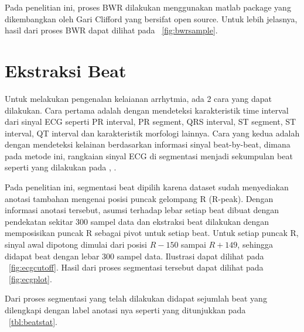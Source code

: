 Pada penelitian ini, proses BWR dilakukan menggunakan matlab package yang
dikembangkan oleh Gari Clifford \cite{clifford-2005} yang bersifat open source.
Untuk lebih jelasnya, hasil dari proses BWR dapat dilihat pada
\pic~\ref{fig:bwrsample}.


\section{Ekstraksi Beat}
\label{sec:ekstractbeat}
Untuk melakukan pengenalan kelaianan arrhytmia, ada 2 cara yang dapat dilakukan.
Cara pertama adalah dengan mendeteksi karakteristik time interval dari sinyal
ECG seperti PR interval, PR segment, QRS interval, ST segment, ST interval, QT
interval dan karakteristik morfologi lainnya. Cara yang kedua adalah dengan
mendeteksi kelainan berdasarkan informasi sinyal beat-by-beat, dimana pada
metode ini, rangkaian sinyal ECG di segmentasi menjadi sekumpulan beat seperti
yang dilakukan pada \cite{Ghongade.1}, \cite{zhao-2005}.

Pada penelitian ini, segmentasi beat dipilih karena dataset sudah menyediakan 
anotasi tambahan mengenai posisi puncak gelompang R (R-peak). Dengan informasi
anotasi tersebut, asumsi terhadap lebar setiap beat dibuat dengan pendekatan
sekitar 300 sampel data dan ekstraksi beat dilakukan dengan memposisikan puncak
R sebagai pivot untuk setiap beat. Untuk setiap puncak R, sinyal awal dipotong
dimulai dari posisi $R-150$ sampai $R+149$, sehingga didapat beat dengan lebar
300 sampel data. Ilustrasi dapat dilihat pada \pic~\ref{fig:ecgcutoff}. Hasil 
dari proses segmentasi tersebut dapat dilihat pada \pic~\ref{fig:ecgplot}.



Dari proses segmentasi yang telah dilakukan didapat sejumlah beat yang
dilengkapi dengan label anotasi nya seperti yang ditunjukkan pada
\tab~\ref{tbl:beatstat}.


